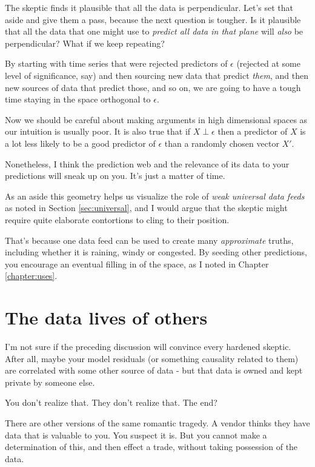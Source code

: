 The skeptic finds it plausible that all the data is perpendicular. Let's set that aside and give them a pass, because the next question is tougher. Is it plausible that all the data that one might use to {\em predict all data in that plane} will {\em also} be perpendicular? What if we keep repeating? 


By starting with time series that were rejected predictors of $\epsilon$ (rejected at some level of significance, say) and then sourcing new data that predict {\em them}, and then new sources of data that predict those, and so on, we are going to have a tough time staying in the space orthogonal to $\epsilon$. 

Now we should be careful about making arguments in high dimensional spaces as our intuition is usually poor. It is also true that if $X \perp \epsilon$ then a predictor of $X$ is a lot less likely to be a good predictor of $\epsilon$ than a randomly chosen vector $X'$.  

Nonetheless, I think the prediction web and the relevance of its data to your predictions will sneak up on you. It's just a matter of time. 

As an aside this geometry helps us visualize the role of {\em weak universal data feeds} as noted in Section \ref{sec:universal}, and I would argue that the skeptic might require quite elaborate contortions to cling to their position.  

That's because one data feed can be used to create many {\em approximate} truths, including whether it is raining, windy or congested. By seeding other predictions, you encourage an eventual filling in of the space, as I noted in Chapter \ref{chapter:uses}.  


\section{The data lives of others}

I'm not sure if the preceding discussion will convince every hardened skeptic. After all, maybe your model residuals (or something causality related to them) are correlated with some other source of data - but that data is owned and kept private by someone else. 

You don't realize that. They don't realize that. The end?  

There are other versions of the same romantic tragedy. A vendor thinks they have data that is valuable to you. You suspect it is. But you cannot make a determination of this, and then effect a trade, without taking possession of the data. 


